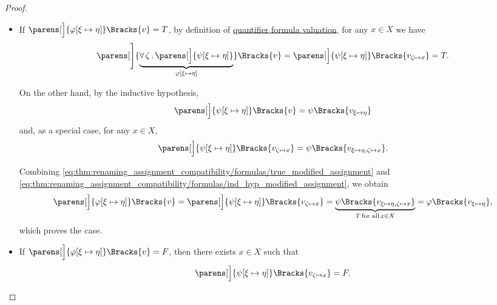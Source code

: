 \begin{proof}
\begin{itemize}
\begin{itemize}
      \begin{itemize}
        \item If \( \parens[\Big]{\varphi[\xi \mapsto \eta]}\Bracks{v} = T \), by definition of \hyperref[def:first_order_valuation/formula_valuation]{quantifier formula valuation}, for any \( x \in X \) we have
        \begin{equation}\label{eq:thm:renaming_assignment_compatibility/formulas/true_modified_assignment}
          \parens[\Bigg]{\underbrace{\qforall \zeta \parens[\Big]{ \psi[\xi \mapsto \eta] }}_{\varphi[\xi \mapsto \eta]} }\Bracks{v}
          =
          \parens[\Big]{\psi[\xi \mapsto \eta]}\Bracks{v_{\zeta \mapsto x}}
          =
          T.
        \end{equation}

        On the other hand, by the inductive hypothesis,
        \begin{equation*}
          \parens[\Big]{ \psi[\xi \mapsto \eta] }\Bracks{v} = \psi\Bracks{v_{\xi \mapsto \eta}}
        \end{equation*}
        and, as a special case, for any \( x \in X \),
        \begin{equation}\label{eq:thm:renaming_assignment_compatibility/formulas/ind_hyp_modified_assignment}
          \parens[\Big]{ \psi[\xi \mapsto \eta] }\Bracks{v_{\zeta \mapsto x}} = \psi\Bracks{v_{\xi \mapsto \eta, \zeta \mapsto x}}.
        \end{equation}

        Combining \eqref{eq:thm:renaming_assignment_compatibility/formulas/true_modified_assignment} and \eqref{eq:thm:renaming_assignment_compatibility/formulas/ind_hyp_modified_assignment}, we obtain
        \begin{equation*}
          \parens[\Big]{ \varphi[\xi \mapsto \eta] }\Bracks{v}
          =
          \parens[\Big]{ \psi[\xi \mapsto \eta] }\Bracks{v_{\zeta \mapsto x}}
          =
          \underbrace{\psi\Bracks{v_{\xi \mapsto \eta, \zeta \mapsto x}}}_{T \T*{for all} x \in X}
          =
          \varphi\Bracks{v_{\xi \mapsto \eta}},
        \end{equation*}
        which proves the case.

        \item If \( \parens[\Big]{\varphi[\xi \mapsto \eta]}\Bracks{v} = F \), then there exists \( x \in X \) such that
        \begin{equation*}
          \parens[\Big]{\psi[\xi \mapsto \eta]}\Bracks{v_{\zeta \mapsto x}} = F.
        \end{equation*}


\end{itemize}
\end{itemize}
\end{itemize}
\end{proof}
